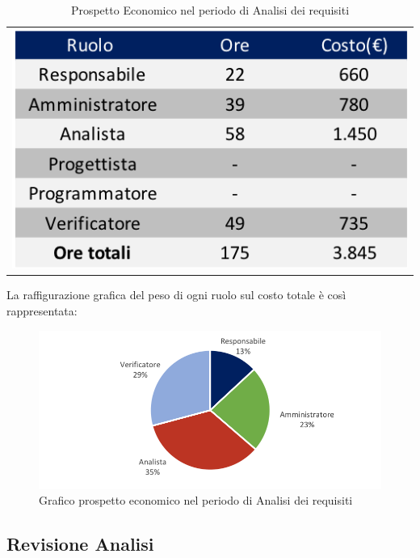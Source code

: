 \begin{table}[!ht]
	\begin{center}
	\begin{tabular}{c}
	\includegraphics{images/tabellaProspettoEconomico.png}
    \end{tabular}
	\caption{Prospetto Economico nel periodo di Analisi dei requisiti}
	\end{center}
\end{table}

La raffigurazione grafica del peso di ogni ruolo sul costo totale è così rappresentata:

\begin{figure}[!ht]
	\centering
	\includegraphics{images/grafoProspettoEconomico.png}
	\caption{Grafico prospetto economico nel periodo di Analisi dei requisiti }
\end{figure}

\newpage
\subsection{Revisione Analisi}
